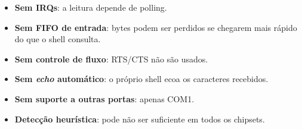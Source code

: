 \begin{itemize}
  \item \textbf{Sem IRQs}: a leitura depende de polling.
  \item \textbf{Sem FIFO de entrada}: bytes podem ser perdidos se chegarem
        mais r\'apido do que o shell consulta.
  \item \textbf{Sem controle de fluxo}: RTS/CTS n\~ao s\~ao usados.
  \item \textbf{Sem \emph{echo} autom\'atico}: o pr\'oprio shell ecoa os
        caracteres recebidos.
  \item \textbf{Sem suporte a outras portas}: apenas COM1.
  \item \textbf{Detec\c{c}\~ao heur\'istica}:  pode n\~ao
        ser suficiente em todos os chipsets.
\end{itemize}
